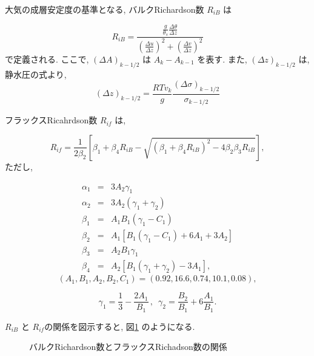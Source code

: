大気の成層安定度の基準となる,
バルクRichardson数 $R_{iB}$ は

\begin{equation}
R_{iB} = \frac{\displaystyle 
               \frac{g}{\theta_s} \frac{\Delta \theta}{\Delta z} }
              {\displaystyle
                  \left( \frac{\Delta u}{\Delta z} \right)^2 
                + \left( \frac{\Delta v}{\Delta z} \right)^2      }
\end{equation}
で定義される.
ここで, $(\Delta A)_{k-1/2}$ は $A_{k} - A_{k-1}$ を表す.
また, $(\Delta z)_{k-1/2}$ は, 静水圧の式より,
\begin{equation}
(\Delta z)_{k-1/2} = \frac{R Tv_{k}}{g} 
                     \frac{(\Delta \sigma)_{k-1/2}}{\sigma_{k-1/2}}
\end{equation}

フラックスRicahrdson数 $R_{if}$ は,

\begin{equation}
R_{if} = \frac{1}{2 \beta_2}
      \left[ \beta_1 + \beta_4 R_{iB}
              - \sqrt{ ( \beta_1 + \beta_4 R_{iB} )^2 
                       - 4 \beta_2 \beta_3 R_{iB} }
              \right] ,
\end{equation}
ただし, 

\begin{eqnarray}
\alpha_1 & = & 3 A_2 \gamma_1  \\
\alpha_2 & = & 3 A_2 (\gamma_1+\gamma_2) \\
\beta_1  & = & A_1 B_1 ( \gamma_1 - C_1 ) \\
\beta_2  & = & A_1 [ B_1 ( \gamma_1 - C_1 ) + 6 A_1 + 3 A_2 ] \\
\beta_3  & = & A_2 B_1 \gamma_1 \\
\beta_4  & = & A_2 [ B_1 ( \gamma_1 + \gamma_2 ) - 3 A_1 ] ,
\end{eqnarray}
\begin{equation}
(A_1, B_1, A_2, B_2, C_1 ) = ( 0.92, 16.6, 0.74, 10.1, 0.08 ) ,
\end{equation}

\begin{equation}
\gamma_1 = \frac{1}{3} - \frac{2 A_1}{B_1}\, , \, \, \, 
\gamma_2 = \frac{B_2}{B_1} + 6\frac{A_1}{B_1} .
\end{equation}

$R_{iB}$ と $R_{if}$の関係を図示すると,
図\ref{p-dif:rib-rif} のようになる.

\begin{figure}[htbp]
  \begin{center}
    \caption{バルクRichardson数とフラックスRichadson数の関係}
    \label{p-dif:rib-rif}
  \end{center}
\end{figure}

